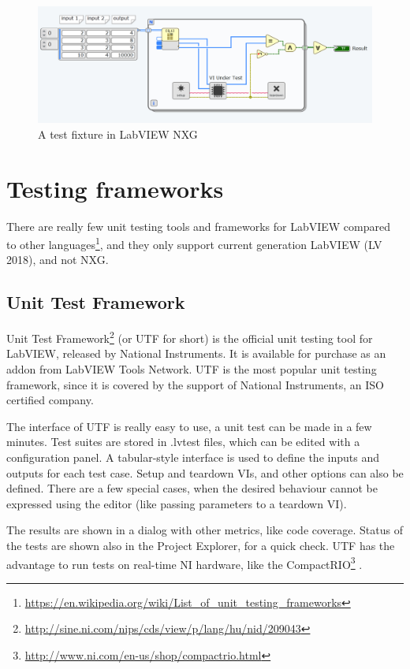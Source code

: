 \begin{figure}
\includegraphics[width=150mm,keepaspectratio]{figures/lv_testsuite.png}
\caption{A test fixture in LabVIEW NXG} 
\label{fig:selfmadetestfixture}
\end{figure}

\section{Testing frameworks}

There are really few unit testing tools and frameworks for LabVIEW compared to other languages\footnote{\url{https://en.wikipedia.org/wiki/List_of_unit_testing_frameworks}}, and they only support current generation LabVIEW (LV 2018), and not NXG.

\subsection{Unit Test Framework}
Unit Test Framework\footnote{\url{http://sine.ni.com/nips/cds/view/p/lang/hu/nid/209043}} (or UTF for short) is the official unit testing tool for LabVIEW, released by National Instruments. It is available for purchase as an addon from LabVIEW Tools Network. UTF is the most popular unit testing framework, since it is covered by the support of National Instruments, an ISO certified company.

The interface of UTF is really easy to use, a unit test can be made in a few minutes. Test suites are stored in .lvtest files, which can be edited with a configuration panel. A tabular-style interface is used to define the inputs and outputs for each test case. Setup and teardown VIs, and other options can also be defined. There are a few special cases, when the desired behaviour cannot be expressed using the editor (like passing parameters to a teardown VI).

The results are shown in a dialog with other metrics, like code coverage. Status of the tests are shown also in the Project Explorer, for a quick check. UTF has the advantage to run tests on real-time NI hardware, like the CompactRIO\footnote{\url{http://www.ni.com/en-us/shop/compactrio.html}} \cite{labview_utf}. 
